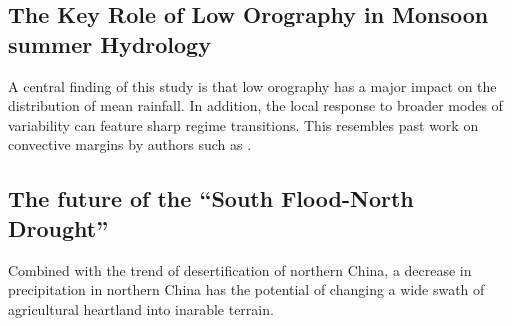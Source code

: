 \subsection{The Key Role of Low Orography in Monsoon summer Hydrology}

A central finding of this study is that low orography has a major impact on the distribution of mean rainfall. In addition, the local response to broader modes of variability can feature sharp regime transitions. This resembles past work on convective margins by authors such as \cite{Lintner2007}.

\subsection{The future of the ``South Flood-North Drought''}

Combined with the trend of desertification of northern China, a decrease in precipitation in northern China has the potential of changing a wide swath of agricultural heartland into inarable terrain.